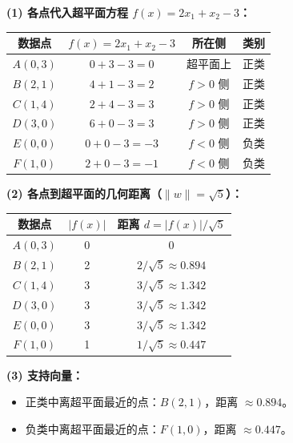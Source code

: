 \documentclass[a4paper,11pt]{ctexart}
\begin{document}
\begin{solutionbox}[参考答案与详细解析]
    \textbf{(1) 各点代入超平面方程 $f(x) = 2x_1 + x_2 - 3$：}

    \begin{center}
    \begin{tabular}{cccc}
        \toprule
        数据点 & $f(x) = 2x_1 + x_2 - 3$ & 所在侧 & 类别 \\
        \midrule
        $A(0,3)$ & $0+3-3=0$ & 超平面上 & 正类 \\
        $B(2,1)$ & $4+1-3=2$ & $f>0$ 侧 & 正类 \\
        $C(1,4)$ & $2+4-3=3$ & $f>0$ 侧 & 正类 \\
        $D(3,0)$ & $6+0-3=3$ & $f>0$ 侧 & 正类 \\
        $E(0,0)$ & $0+0-3=-3$ & $f<0$ 侧 & 负类 \\
        $F(1,0)$ & $2+0-3=-1$ & $f<0$ 侧 & 负类 \\
        \bottomrule
    \end{tabular}
    \end{center}

    \textbf{(2) 各点到超平面的几何距离（$\|w\|=\sqrt{5}$）：}

    \begin{center}
    \begin{tabular}{ccc}
        \toprule
        数据点 & $|f(x)|$ & 距离 $d = |f(x)|/\sqrt{5}$ \\
        \midrule
        $A(0,3)$ & 0 & $0$ \\
        $B(2,1)$ & 2 & $2/\sqrt{5} \approx 0.894$ \\
        $C(1,4)$ & 3 & $3/\sqrt{5} \approx 1.342$ \\
        $D(3,0)$ & 3 & $3/\sqrt{5} \approx 1.342$ \\
        $E(0,0)$ & 3 & $3/\sqrt{5} \approx 1.342$ \\
        $F(1,0)$ & 1 & $1/\sqrt{5} \approx 0.447$ \\
        \bottomrule
    \end{tabular}
    \end{center}

    \textbf{(3) 支持向量：}

    \begin{itemize}
        \item 正类中离超平面最近的点：$B(2,1)$，距离 $\approx 0.894$。
        \item 负类中离超平面最近的点：$F(1,0)$，距离 $\approx 0.447$。
    \end{itemize}


\end{solutionbox}
\end{document}
